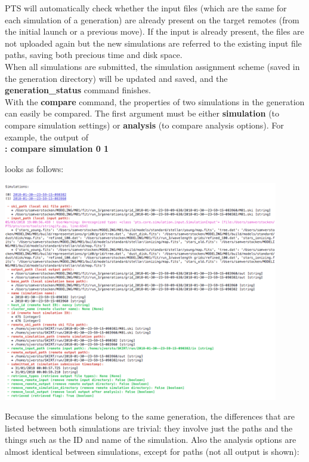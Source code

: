 \documentclass[15pt,a4paper,oneside,openright]{report}
\begin{document}
PTS will automatically check whether the input files (which are the same for each simulation of a generation) are already present on the target remotes (from the initial launch or a previous move). If the input is already present, the files are not uploaded again but the new simulations are referred to the existing input file paths, saving both precious time and disk space.\\

When all simulations are submitted, the simulation assignment scheme (saved in the generation directory) will be updated and saved, and the \textbf{generation\_status} command finishes.\\

With the \textbf{compare} command, the properties of two simulations in the generation can easily be compared. The first argument must be either \textbf{simulation} (to compare simulation settings) or \textbf{analysis} (to compare analysis options). For example, the output of\\

\textbf{: compare simulation 0 1}

looks as follows:

\begin{center}
\includegraphics[width=0.9\textwidth]{figures/compare.png}
\end{center}

Because the simulations belong to the same generation, the differences that are listed between both simulations are trivial: they involve just the paths and the things such as the ID and name of the simulation. Also the analysis options are almost identical between simulations, except for paths (not all output is shown):
\end{document}
